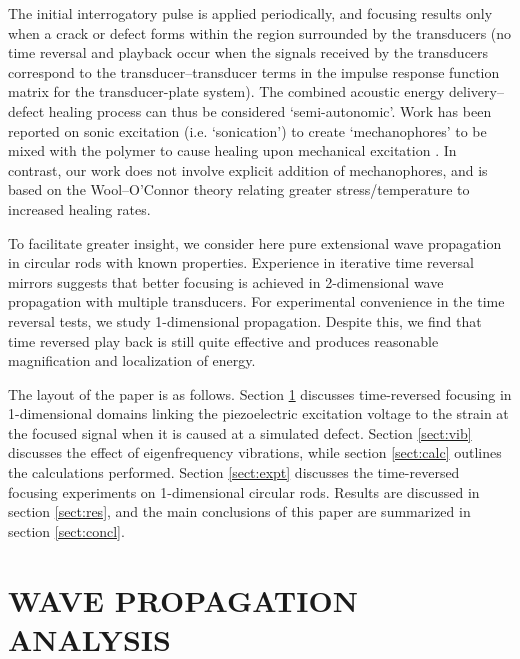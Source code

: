 \documentclass[11pt,letterpaper]{article}%
\begin{document}
The initial interrogatory pulse is applied periodically, and
focusing results only when a crack or defect forms within the
region surrounded by the transducers (no time reversal and
playback occur when the signals received by the transducers
correspond to the transducer--transducer terms in the impulse
response function matrix for the transducer-plate system).  The
combined acoustic energy delivery--defect healing process can thus
be considered `semi-autonomic'.  Work has been reported on sonic
excitation (i.e. `sonication') to create `mechanophores' to be
mixed with the polymer to cause healing upon mechanical excitation
\cite{kryger}. In contrast, our work does not involve explicit
addition of  mechanophores, and is based on the Wool--O'Connor
theory relating greater stress/temperature to increased healing
rates.


To facilitate greater insight, we consider here pure extensional
wave propagation in circular rods with known properties. Experience in iterative time reversal mirrors suggests that better
focusing is achieved in 2-dimensional wave propagation with
multiple transducers. For experimental convenience in the time reversal tests, we
study 1-dimensional propagation. Despite this, we find that time
reversed play back is still quite effective and produces
reasonable magnification and localization of energy.

The layout of the paper is as follows. Section \ref{sect:wav} discusses time-reversed focusing in
1-dimensional domains linking the piezoelectric excitation voltage
to the strain at the focused signal when it is caused at a
simulated defect. Section \ref{sect:vib} discusses the effect of
eigenfrequency vibrations, while section \ref{sect:calc} outlines
the calculations performed. Section \ref{sect:expt} discusses the time-reversed
focusing experiments on 1-dimensional circular rods. Results are
discussed in section \ref{sect:res}, and the main conclusions of
this paper are summarized in section \ref{sect:concl}.

\section{WAVE PROPAGATION ANALYSIS}
\label{sect:wav}
\end{document}
